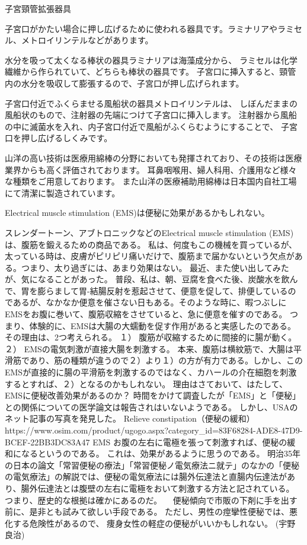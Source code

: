 子宮頸管拡張器具

子宮口がかたい場合に押し広げるために使われる器具です。ラミナリアやラミセル、メトロイリンテルなどがあります。

水分を吸って太くなる棒状の器具ラミナリアは海藻成分から、
ラミセルは化学繊維から作られていて、どちらも棒状の器具です。
子宮口に挿入すると、頸管内の水分を吸収して膨張するので、子宮口が押し広げられます。

子宮口付近でふくらませる風船状の器具メトロイリンテルは、
しぼんだままの風船状のもので、注射器の先端につけて子宮口に挿入します。
注射器から風船の中に滅菌水を入れ、内子宮口付近で風船がふくらむようにすることで、
子宮口を押し広げるしくみです。



山洋の高い技術は医療用綿棒の分野においても発揮されており、その技術は医療業界からも高く評価されております。
耳鼻咽喉用、婦人科用、介護用など様々な種類をご用意しております。
また山洋の医療補助用綿棒は日本国内自社工場にて清潔に製造されています。 


Electrical muscle stimulation (EMS)は便秘に効果があるかもしれない。

スレンダートーン、アブトロニックなどのElectrical muscle stimulation (EMS)は、腹筋を鍛えるための商品である。
私は、何度もこの機械を買っているが、太っている時は、皮膚がピリピリ痛いだけで、腹筋まで届かないという欠点がある。つまり、太り過ぎには、あまり効果はない。
最近、また使い出してみたが、気になることがあった。
普段、私は、朝、豆腐を食べた後、炭酸水を飲んで、胃を膨らまして胃-結腸反射を惹起させて、便意を促して、排便しているのであるが、なかなか便意を催さない日もある。そのような時に、暇つぶしにEMSをお腹に巻いて、腹筋収縮をさせていると、急に便意を催すのである。
つまり、体験的に、EMSは大腸の大蠕動を促す作用があると実感したのである。
その理由は、2つ考えられる。
１）      腹筋が収縮するために間接的に腸が動く。
２）      EMSの電気刺激が直接大腸を刺激する。
本来、腹筋は横紋筋で、大腸は平滑筋であり、筋の種類が違うので２）より１）の方が有力である。しかし、このEMSが直接的に腸の平滑筋を刺激するのではなく、カハールの介在細胞を刺激するとすれば、２）となるのかもしれない。
理由はさておいて、はたして、EMSに便秘改善効果があるのか？
時間をかけて調査したが「EMS」と「便秘」との関係についての医学論文は報告されはいないようである。
しかし、USAのネット記事の写真を発見した。
Relieve constipation（便秘の緩和）
https://www.osim.com/product/ugogo.aspx?category_id=83F68284-ADE8-47D9-BCEF-22BB3DC83A47
EMS
お腹の左右に電極を張って刺激すれば、便秘の緩和になるというのである。
これは、効果があるように思うのである。
明治35年の日本の論文「常習便秘の療法」「常習便秘ノ電気療法ニ就テ」のなかの「便秘の電気療法」の解説では、便秘の電気療法には腸外伝達法と直腸内伝達法があり、腸外伝達法とは腹壁の左右に電極をおいて刺激する方法と記されている。
つまり、歴史的な根拠は確かにあるのだ。
　便秘傾向で市販の下剤に手を出す前に、是非とも試みて欲しい手段である。
ただし、男性の痙攣性便秘では、悪化する危険性があるので、
痩身女性の軽症の便秘がいいかもしれない。
(宇野良治)



